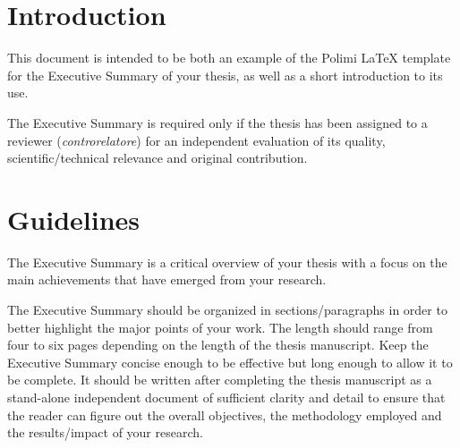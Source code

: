 \documentclass[11pt,a4paper,twocolumn]{article}
\begin{document}



\section{Introduction}
\label{sec:introduction}

This document is intended to be both an example of the Polimi \LaTeX{} template for the Executive Summary
of your thesis, as well as a short introduction to its use.

The Executive Summary is required only
if the thesis has been assigned to a reviewer (\textit{controrelatore})
for an independent evaluation of its quality, scientific/technical relevance and original contribution.

\section{Guidelines}
\label{sec:guidelines}

The Executive Summary is a critical overview of your thesis
with a focus on the main achievements that have emerged from your research.

The Executive Summary should be organized in sections/paragraphs
in order to better highlight the major points of your work.
The length should range from four to six pages depending on the length of the thesis manuscript.
Keep the Executive Summary concise enough to be effective but long enough to allow it to be complete.
It should be written after completing the thesis manuscript as a stand-alone independent document
of sufficient clarity and detail to ensure that the reader can figure out the overall objectives,
the methodology employed and the results/impact of your research.
\end{document}
